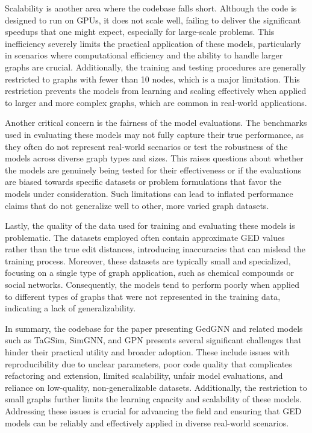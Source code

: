 \documentclass[../Thesis.tex]{subfiles}
\begin{document}
	Scalability is another area where the codebase falls short. Although the code is designed to run on GPUs, it does not scale well, failing to deliver the significant speedups that one might expect, especially for large-scale problems. This inefficiency severely limits the practical application of these models, particularly in scenarios where computational efficiency and the ability to handle larger graphs are crucial. Additionally, the training and testing procedures are generally restricted to graphs with fewer than 10 nodes, which is a major limitation. This restriction prevents the models from learning and scaling effectively when applied to larger and more complex graphs, which are common in real-world applications.
	
	Another critical concern is the fairness of the model evaluations. The benchmarks used in evaluating these models may not fully capture their true performance, as they often do not represent real-world scenarios or test the robustness of the models across diverse graph types and sizes. This raises questions about whether the models are genuinely being tested for their effectiveness or if the evaluations are biased towards specific datasets or problem formulations that favor the models under consideration. Such limitations can lead to inflated performance claims that do not generalize well to other, more varied graph datasets.
	
	Lastly, the quality of the data used for training and evaluating these models is problematic. The datasets employed often contain approximate GED values rather than the true edit distances, introducing inaccuracies that can mislead the training process. Moreover, these datasets are typically small and specialized, focusing on a single type of graph application, such as chemical compounds or social networks. Consequently, the models tend to perform poorly when applied to different types of graphs that were not represented in the training data, indicating a lack of generalizability.
	
	In summary, the codebase for the paper presenting GedGNN and related models such as TaGSim, SimGNN, and GPN presents several significant challenges that hinder their practical utility and broader adoption. These include issues with reproducibility due to unclear parameters, poor code quality that complicates refactoring and extension, limited scalability, unfair model evaluations, and reliance on low-quality, non-generalizable datasets. Additionally, the restriction to small graphs further limits the learning capacity and scalability of these models. Addressing these issues is crucial for advancing the field and ensuring that GED models can be reliably and effectively applied in diverse real-world scenarios.


	
\end{document}

